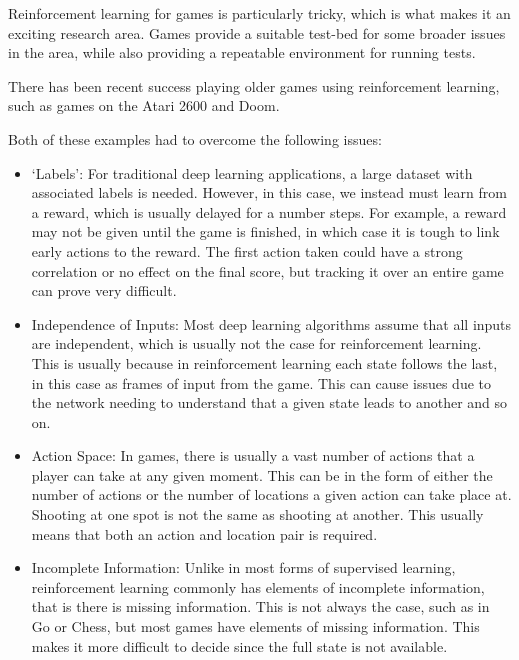 Reinforcement learning for games is particularly tricky, which is what makes it
an exciting research area. Games provide a suitable test-bed for some broader
issues in the area, while also providing a repeatable environment for running
tests.

There has been recent success playing older games using reinforcement learning,
such as games on the Atari 2600\cite{mnih2013playing} and
Doom\cite{kempka2016vizdoom}.

Both of these examples had to overcome the following issues:

\begin{itemize}
    \item `Labels': For traditional deep learning applications, a large dataset
        with associated labels is needed. However, in this case, we instead must
        learn from a reward, which is usually delayed for a number steps. For
        example, a reward may not be given until the game is finished, in which
        case it is tough to link early actions to the reward. The first
        action taken could have a strong correlation or no effect on the final
        score, but tracking it over an entire game can prove very difficult.
    \item Independence of Inputs: Most deep learning algorithms assume that
        all inputs are independent, which is usually not the case for
        reinforcement learning. This is usually because in reinforcement
        learning each state follows the last, in this case as frames of input
        from the game. This can cause issues due to the network needing to
        understand that a given state leads to another and so on.
    \item Action Space: In games, there is usually a vast number of actions that
        a player can take at any given moment. This can be in the form of either
        the number of actions or the number of locations a given action can
        take place at. Shooting at one spot is not the same as shooting at
        another. This usually means that both an action and location pair is
        required.
    \item Incomplete Information: Unlike in most forms of supervised learning,
        reinforcement learning commonly has elements of incomplete information,
        that is there is missing information. This is not always the case, such
        as in Go or Chess, but most games have elements of missing information.
        This makes it more difficult to decide since the full state is
        not available.
\end{itemize}

